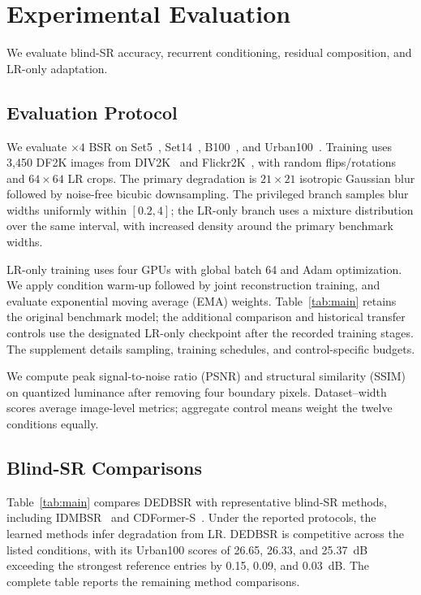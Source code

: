 \documentclass[10pt,journal,letterpaper]{IEEEtran}
\begin{document}
\section{Experimental Evaluation}
\label{sec:experiments}
We evaluate blind-SR accuracy, recurrent conditioning, residual composition, and LR-only adaptation.

\subsection{Evaluation Protocol}
We evaluate $\times4$ BSR on Set5~\cite{bevilacqua2012set5}, Set14~\cite{zeyde2012set14}, B100~\cite{martin2001bsd}, and Urban100~\cite{huang2015urban100}. Training uses 3,450 DF2K images from DIV2K~\cite{agustsson2017div2k} and Flickr2K~\cite{lim2017edsr}, with random flips/rotations and $64\times64$ LR crops. The primary degradation is $21\times21$ isotropic Gaussian blur followed by noise-free bicubic downsampling. The privileged branch samples blur widths uniformly within $[0.2,4]$; the LR-only branch uses a mixture distribution over the same interval, with increased density around the primary benchmark widths.

LR-only training uses four GPUs with global batch 64 and Adam optimization. We apply condition warm-up followed by joint reconstruction training, and evaluate exponential moving average (EMA) weights. Table~\ref{tab:main} retains the original benchmark model; the additional comparison and historical transfer controls use the designated LR-only checkpoint after the recorded training stages. The supplement details sampling, training schedules, and control-specific budgets.

We compute peak signal-to-noise ratio (PSNR) and structural similarity (SSIM) on quantized luminance after removing four boundary pixels. Dataset--width scores average image-level metrics; aggregate control means weight the twelve conditions equally.

\subsection{Blind-SR Comparisons}
Table~\ref{tab:main} compares DEDBSR with representative blind-SR methods, including IDMBSR~\cite{zhang2022idmbsr} and CDFormer-S~\cite{liu2024cdformer}. Under the reported protocols, the learned methods infer degradation from LR. DEDBSR is competitive across the listed conditions, with its Urban100 scores of 26.65, 26.33, and 25.37~dB exceeding the strongest reference entries by 0.15, 0.09, and 0.03~dB. The complete table reports the remaining method comparisons.
\end{document}
